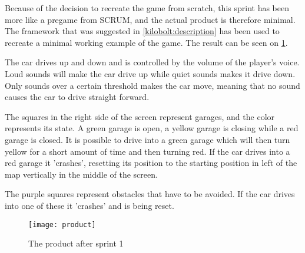 Because of the decision to recreate the game from scratch, this sprint has been more like a pregame from SCRUM, and the actual product is therefore minimal.
The framework that was suggested in \cref{kilobolt:description} has been used to recreate a minimal working example of the game.
The result can be seen on \cref{product-sprint1}.

The car drives up and down and is controlled by the volume of the player's voice. 
Loud sounds will make the car drive up while quiet sounds makes it drive down.
Only sounds over a certain threshold makes the car move, meaning that no sound causes the car to drive straight forward.

The squares in the right side of the screen represent garages, and the color represents its state. 
A green garage is open, a yellow garage is closing while a red garage is closed.
It is possible to drive into a green garage which will then turn yellow for a short amount of time and then turning red.
If the car drives into a red garage it 'crashes', resetting its position to the starting position in left of the map vertically in the middle of the screen.

The purple squares represent obstacles that have to be avoided. 
If the car drives into one of these it 'crashes' and is being reset.


\begin{figure}
\texttt{[image: product]}
\caption{The product after sprint 1}
\label{product-sprint1}
\end{figure}
